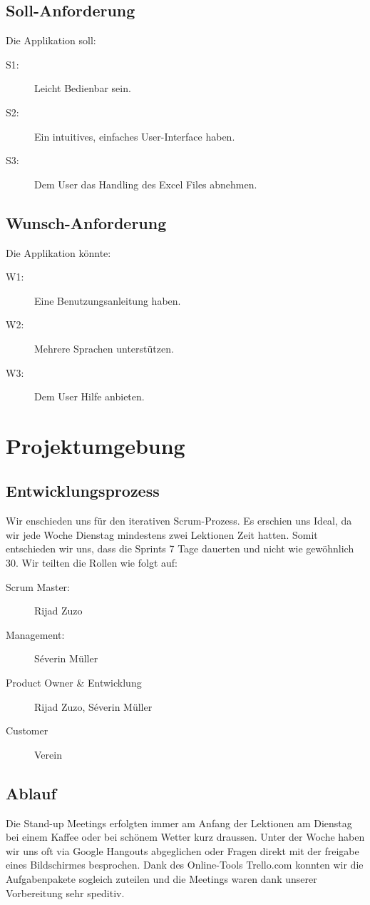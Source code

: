 \documentclass{article}
\begin{document}
\subsection{Soll-Anforderung}
Die Applikation soll:
\begin{description}
	\item[S1:] Leicht Bedienbar sein.
	\item[S2:] Ein intuitives, einfaches User-Interface haben.
	\item[S3:] Dem User das Handling des Excel Files abnehmen.
\end{description}

\subsection{Wunsch-Anforderung}
Die Applikation könnte:
\begin{description}
	\item[W1:] Eine Benutzungsanleitung haben.
	\item[W2:] Mehrere Sprachen unterstützen.
	\item[W3:] Dem User Hilfe anbieten.
\end{description}

\newpage

\section{Projektumgebung}
\vspace{5mm}
\subsection{Entwicklungsprozess	}
Wir enschieden uns für den iterativen Scrum-Prozess. Es erschien uns Ideal, da wir jede Woche Dienstag mindestens zwei Lektionen Zeit hatten. Somit entschieden wir uns, dass die Sprints 7 Tage dauerten und nicht wie gewöhnlich 30. Wir teilten die Rollen wie folgt auf:

\begin{description}
	\item[Scrum Master:] Rijad Zuzo
	\item[Management:] Séverin Müller
	\item[Product Owner \& Entwicklung] Rijad Zuzo, Séverin Müller
	\item[Customer] Verein
\end{description}

\subsection{Ablauf}
Die Stand-up Meetings erfolgten immer am Anfang der Lektionen am Dienstag bei einem Kaffee oder bei schönem Wetter kurz draussen. Unter der Woche haben wir uns oft via Google Hangouts abgeglichen oder Fragen direkt mit der freigabe eines Bildschirmes besprochen. 
Dank des Online-Tools Trello.com konnten wir die Aufgabenpakete sogleich zuteilen und die Meetings waren dank unserer Vorbereitung sehr speditiv. 
\end{document}
